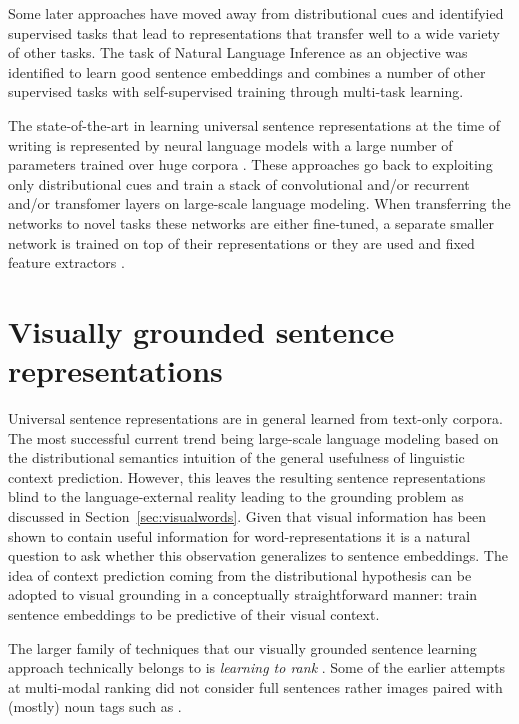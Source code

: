 Some later approaches have  moved away from distributional cues
and identifyied supervised tasks that lead to representations that transfer
well to a wide variety of other tasks. The task of Natural Language Inference \citep{bowman2015large,williams2017broad} as an objective
was identified to learn good sentence embeddings \citep{conneau-EtAl:2017:EMNLP2017,kiros2018inferlite}
and \cite{subramanian2018learning} combines a number of other supervised tasks
with self-supervised training through multi-task learning.


The state-of-the-art in learning universal sentence representations
at the time of writing is represented by neural language models
with a large number of parameters
trained over huge corpora \citep{peters2018deep,devlin2018bert}.
These approaches go back to
exploiting only distributional cues and train a stack of convolutional and/or recurrent
and/or transfomer layers on large-scale language modeling.
When transferring the networks to novel tasks these networks are either fine-tuned, a
separate smaller network is trained on top of their representations or they are used and
fixed feature extractors \citep{howard2018universal,peters2019tune}.

\section{Visually grounded sentence representations}
\label{sec:visualsentences}

Universal sentence representations are in general learned from text-only corpora. The most
successful current trend being large-scale language modeling based on
the distributional semantics intuition of the general usefulness of linguistic context prediction.
However, this leaves the resulting sentence representations blind to the language-external
reality leading to the grounding problem
as discussed in Section~\ref{sec:visualwords}. Given that visual information
has been shown to contain useful information for word-representations it
is a natural question to ask whether this observation generalizes to sentence
embeddings. The idea of context prediction coming from the distributional
hypothesis can be adopted to visual grounding in a conceptually straightforward manner:
train sentence embeddings to be predictive of their visual context.

The larger family of techniques that our visually grounded sentence learning
approach technically belongs to is \emph{learning to rank} \citep{li2011learning}.
Some of the earlier attempts at multi-modal ranking did not consider full sentences rather
images paired with (mostly) noun tags such as \cite{weston2010large}.

